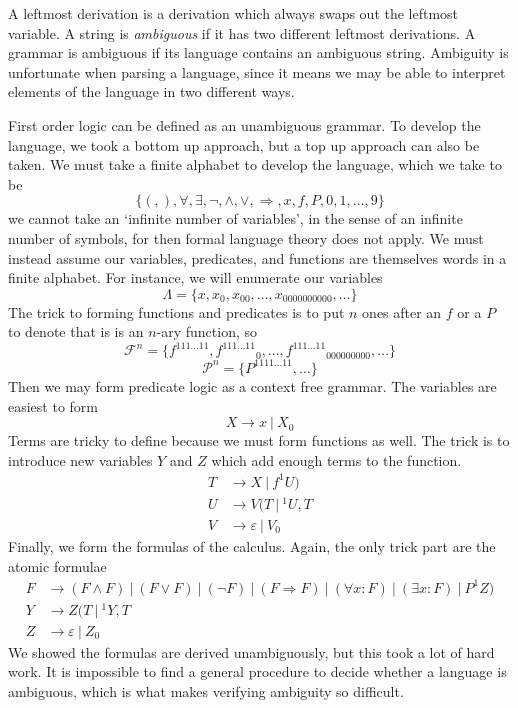 A leftmost derivation is a derivation which always swaps out the leftmost variable. A string is \emph{ambiguous} if it has two different leftmost derivations. A grammar is ambiguous if its language contains an ambiguous string. Ambiguity is unfortunate when parsing a language, since it means we may be able to interpret elements of the language in two different ways.

\begin{example}
    First order logic can be defined as an unambiguous grammar. To develop the language, we took a bottom up approach, but a top up approach can also be taken. We must take a finite alphabet to develop the language, which we take to be
    \[ \{ (, ), \forall, \exists, \neg, \wedge, \vee, \Rightarrow, x, f, P, 0, 1, \dots, 9 \} \]
    we cannot take an `infinite number of variables', in the sense of an infinite number of symbols, for then formal language theory does not apply. We must instead assume our variables, predicates, and functions are themselves words in a finite alphabet. For instance, we will enumerate our variables
    \[ \Lambda = \{ x, x_0, x_{00}, \dots, x_{0000000000}, \dots \} \]
    The trick to forming functions and predicates is to put $n$ ones after an $f$ or a $P$ to denote that is is an $n$-ary function, so
    \[ \mathcal{F}^n = \{ \left.f^{111 \dots 11}\right., \left.f^{111\dots11}\right._0, \dots, \left.f^{111 \dots 11}\right._{000000000}, \dots \} \]
    \[ \mathcal{P}^n = \{ P^{1111\dots11}, \dots \} \]
    Then we may form predicate logic as a context free grammar. The variables are easiest to form
    \[ X \rightarrow {x}\ |\ {X_0} \]
    Terms are tricky to define because we must form functions as well. The trick is to introduce new variables $Y$ and $Z$ which add enough terms to the function.
    \begin{align*}
        T &\rightarrow {X}\ |\ {f^1U)}\\
        U &\rightarrow {V(T}\ |\ {^1U, T}\\
        V &\rightarrow \varepsilon\ |\ V_0
    \end{align*}
    Finally, we form the formulas of the calculus. Again, the only trick part are the atomic formulae
    \begin{align*}
        F &\rightarrow {(F \wedge F)}\ |\ {(F \vee F)}\ |\ {(\neg F)}\ |\ {(F \Rightarrow F)}\ |\ {(\forall x: F)}\ |\ {(\exists x: F)}\ |\ {P^1Z)}\\
        Y &\rightarrow {Z(T}\ |\ {^1Y, T}\\
        Z &\rightarrow \varepsilon\ |\ Z_0
    \end{align*}
    We showed the formulas are derived unambiguously, but this took a lot of hard work. It is impossible to find a general procedure to decide whether a language is ambiguous, which is what makes verifying ambiguity so difficult.
\end{example}

